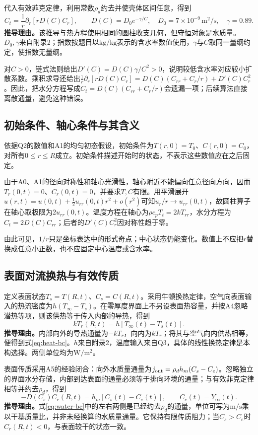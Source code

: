 \documentclass[UTF8,a4paper,zihao=-4,fontset=none]{ctexart}
\numberwithin{equation}{section}
\newcommand{\pd}{\partial}
\newcommand{\units}[1]{\,\mathrm{#1}}
\newcommand{\reason}[1]{\textbf{推导理由。}#1\par}
\begin{document}
代入有效菲克定律，利用常数$\rho_d$约去并使壳体区间任意，得到
\begin{equation}
C_t=\frac1r\pd_r\!\left[rD(C)C_r\right],
\qquad D(C)=D_0e^{-\gamma/C},\quad
D_0=7\times10^{-9}\units{m^2/s},\quad\gamma=0.89.
\label{eq:water}
\end{equation}
\reason{该推导与热方程使用相同的圆柱收支几何，但守恒对象是水质量。$D_0,\gamma$来自附录2；指数按题目以$\mathrm{kg/kg}$表示的含水率数值使用，$\gamma$与$C$取同一量纲约定，使指数无量纲。}

对$C>0$，链式法则给出$D'(C)=D(C)\gamma/C^2>0$，说明较低含水率对应较小扩散系数。乘积求导还给出$\frac1r\pd_r[rD(C)C_r]=D(C)(C_{rr}+C_r/r)+D'(C)C_r^2$。因此，把水分方程写成$C_t=D(C)(C_{rr}+C_r/r)$会遗漏一项；后续算法直接离散通量，避免这种错误。

\subsection{初始条件、轴心条件与其含义}
依据Q2的数值和A1的均匀初态假设，初始条件为$T(r,0)=T_0$、$C(r,0)=C_0$，对所有$0\le r\le R$成立。初始条件描述开始时的状态，不表示这些数值应在之后固定。

由于A0、A1的径向对称性和轴心光滑性，轴心附近不能偏向任意径向方向，因而$T_r(0,t)=0$、$C_r(0,t)=0$，并要求$T,C$有限。用平滑展开$u(r,t)=u(0,t)+\tfrac12u_{rr}(0,t)r^2+o(r^2)$可知$u_r/r\to u_{rr}(0,t)$，故圆柱算子在轴心取极限为$2u_{rr}(0,t)$。温度方程在轴心为$\rho c_pT_t=2kT_{rr}$，水分方程为$C_t=2D(C)C_{rr}$；后者的$D'(C)C_r^2$因对称性趋于零。

由此可见，$1/r$只是坐标表达中的形式奇点；中心状态仍能变化。数值上不应把$r$替换成任意小正数，也不应固定中心温度或含水率。

\subsection{表面对流换热与有效传质}
定义表面状态$T_s=T(R,t)$、$C_s=C(R,t)$。采用牛顿换热定律，空气向表面输入的热流密度为$h(T_\infty-T_s)$。在零厚度界面上不另设表面热容量，并按A4忽略潜热等项，则该供热等于传入内部的导热，得到
\begin{equation}
kT_r(R,t)=h[T_\infty(t)-T_s(t)].
\label{eq:heat-bc}
\end{equation}
\reason{内部向外的导热通量为$-kT_r$，向内为$kT_r$；将其与空气向内供热相等，便得到式\eqref{eq:heat-bc}。$h$来自附录2，温度输入来自Q3，具体的线性换热定律是本构选择。两侧单位均为$\mathrm{W/m^2}$。}

表面传质采用A5的经验闭合：向外水质量通量为$j_{\rm out}=\rho_dh_m(C_s-C_e)$。忽略独立的界面水分存储，内部到达表面的通量必须等于排向环境的通量；与有效菲克定律相等并约去$\rho_d$，得到
\begin{equation}
-D(C_s)C_r(R,t)=h_m[C_s(t)-C_e(t)],
\qquad C_e(t)=Y_\infty(t).
\label{eq:water-bc}
\end{equation}
\reason{式\eqref{eq:water-bc}中的左右两侧是已经约去$\rho_d$的通量，单位可写为$\mathrm{m/s}$乘以干基质量比，并非未经换算的水质量通量。它保持有限传质阻力；当$C_s>C_e$时$C_r(R,t)<0$，与表面较干的状态一致。}
\end{document}
